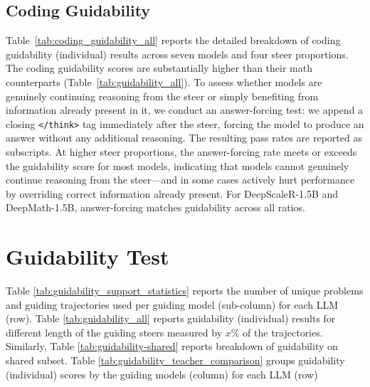 \documentclass{article} %
\begin{document}
\subsection{Coding Guidability}
\label{sec:appendix_coding_guidability}

Table~\ref{tab:coding_guidability_all} reports the detailed breakdown of coding guidability (individual) results across seven models and four steer proportions. The coding guidability scores are substantially higher than their math counterparts (Table~\ref{tab:guidability_all}). To assess whether models are genuinely continuing reasoning from the steer or simply benefiting from information already present in it, we conduct an answer-forcing test: we append a closing \texttt{</think>} tag immediately after the steer, forcing the model to produce an answer without any additional reasoning. The resulting pass rates are reported as subscripts. At higher steer proportions, the answer-forcing rate meets or exceeds the guidability score for most models, indicating that models cannot genuinely continue reasoning from the steer---and in some cases actively hurt performance by overriding correct information already present. For DeepScaleR-1.5B and DeepMath-1.5B, answer-forcing matches guidability across all ratios.

\section{Guidability Test}
\label{sec:appendix_guidability_test}

Table \ref{tab:guidability_support_statistics} reports the number of unique problems and guiding trajectories used per guiding model (sub-column) for each LLM (row). Table \ref{tab:guidability_all} reports guidability (individual) results for different length of the guiding steers measured by $x\%$ of the trajectories. Similarly, Table \ref{tab:guidability-shared} reports breakdown of guidability on shared subset. Table \ref{tab:guidability_teacher_comparison} groups guidability (individual) scores by the guiding models (column) for each LLM (row)
\end{document}

